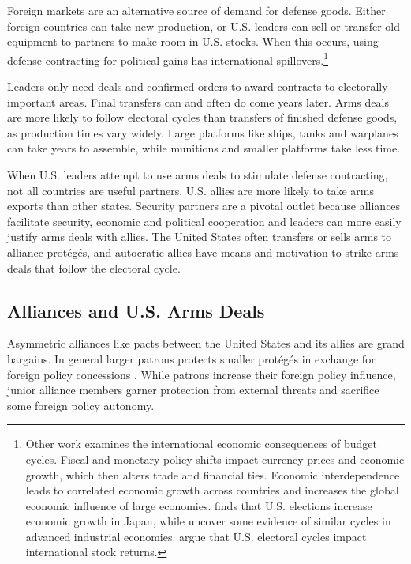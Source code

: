 \documentclass[12pt]{article}
\begin{document}
Foreign markets are an alternative source of demand for defense goods.
Either foreign countries can take new production, or U.S. leaders can sell or transfer old equipment to partners to make room in U.S. stocks. 
When this occurs, using defense contracting for political gains has international spillovers.\footnote{%
Other work examines the international economic consequences of budget cycles.
Fiscal and monetary policy shifts impact currency prices and economic growth, which then alters trade and financial ties. 
Economic interdependence leads to correlated economic growth across countries \citep{ArtisZhang1999, Kayser2006} and increases the global economic influence of large economies. 
\citet{Ito1991} finds that U.S. elections increase economic growth in Japan, while \citet{ThompsonZuk1983} uncover some evidence of similar cycles in advanced industrial economies.
\citet{FoersterSchmitz1997} argue that U.S. electoral cycles impact international stock returns.
}


Leaders only need deals and confirmed orders to award contracts to electorally important areas.
Final transfers can and often do come years later. 
Arms deals are more likely to follow electoral cycles than transfers of finished defense goods, as production times vary widely. 
Large platforms like ships, tanks and warplanes can take years to assemble, while munitions and smaller platforms take less time. 


When U.S. leaders attempt to use arms deals to stimulate defense contracting, not all countries are useful partners. 
U.S. allies are more likely to take arms exports than other states. 
Security partners are a pivotal outlet because alliances facilitate security, economic and political cooperation and leaders can more easily justify arms deals with allies. 
The United States often transfers or sells arms to alliance prot{\'e}g{\'e}s, and autocratic allies have means and motivation to strike arms deals that follow the electoral cycle. 



\subsection{Alliances and U.S. Arms Deals}


Asymmetric alliances like pacts between the United States and its allies are grand bargains.
In general larger patrons protects smaller prot{\'e}g{\'e}s in exchange for foreign policy concessions \citep{Morrow1991}.
While patrons increase their foreign policy influence, junior alliance members garner protection from external threats and sacrifice some foreign policy autonomy.
\end{document}
